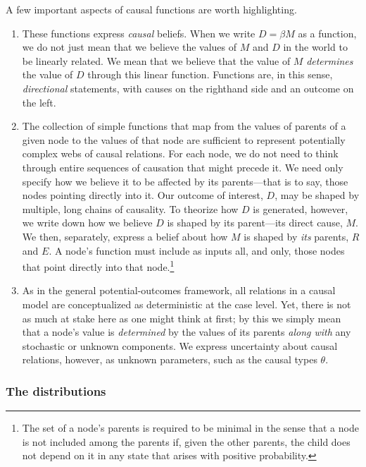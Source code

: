 \documentclass[
  12pt,
]{book}
\begin{document}
A few important aspects of causal functions are worth highlighting.

\begin{enumerate}
\def\labelenumi{\arabic{enumi}.}
\item
  These functions express \emph{causal} beliefs. When we write \(D=\beta M\) as a function, we do not just mean that we believe the values of \(M\) and \(D\) in the world to be linearly related. We mean that we believe that the value of \(M\) \emph{determines} the value of \(D\) through this linear function. Functions are, in this sense, \emph{directional} statements, with causes on the righthand side and an outcome on the left.
\item
  The collection of simple functions that map from the values of parents of a given node to the values of that node are sufficient to represent potentially complex webs of causal relations. For each node, we do not need to think through entire sequences of causation that might precede it. We need only specify how we believe it to be affected by its parents---that is to say, those nodes pointing directly into it. Our outcome of interest, \(D\), may be shaped by multiple, long chains of causality. To theorize how \(D\) is generated, however, we write down how we believe \(D\) is shaped by its parent---its direct cause, \(M\). We then, separately, express a belief about how \(M\) is shaped by \emph{its} parents, \(R\) and \(E\). A node's function must include as inputs all, and only, those nodes that point directly into that node.\footnote{The set of a node's parents is required to be minimal in the sense that a node is not included among the parents if, given the other parents, the child does not depend on it in any state that arises with positive probability.}
\item
  As in the general potential-outcomes framework, all relations in a causal model are conceptualized as deterministic at the case level. Yet, there is not as much at stake here as one might think at first; by this we simply mean that a node's value is \emph{determined} by the values of its parents \emph{along with} any stochastic or unknown components. We express uncertainty about causal relations, however, as unknown parameters, such as the causal types \(\theta\).
\end{enumerate}

\hypertarget{the-distributions}{%
\subsubsection{The distributions}\label{the-distributions}}
\end{document}
